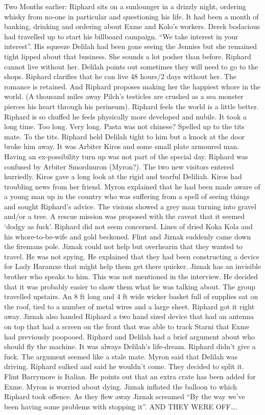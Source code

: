 Two Months earlier: Riphard sits on a sunlounger in a drizzly night, ordering whisky from no-one in particular and questioning his life. It had been a month of banking, drinking and ordering about Exme and Kolo’s workers. Derek bodacious had travelled up to start his billboard campaign. “We take interest in your interest”. His squeeze Delilah had been gone seeing the Jennies but she remained tight lipped about that business. She sounds a lot posher than before. Riphard cannot live without her. Delilah points out sometimes they will need to go to the shops. Riphard clarifies that he can live 48 hours/2 days without her. The romance is retained. And Riphard proposes making her the happiest whore in the world. (A thousand miles away Pilch’s testicles are crushed as a sea monster pierces his heart through his perineum). Riphard feels the world is a little better. Riphard is so chuffed he feels physically more developed and nubile. It took a long time. Too long. Very long. Pasta was not chinese? Spelled up to the tits mate. To the tits. Riphard held Delilah tight to him but a knock at the door broke him away. It was Arbiter Kiros and some small plate armoured man. Having an ex-possibility turn up was not part of the special day. Riphard was confused by Arbiter Smordnuron (Myron?). The two new visitors entered hurriedly. Kiros gave a long look at the rigid and tearful Deliliah. Kiros had troubling news from her friend. Myron explained that he had been made aware of a young man up in the country who was suffering from a spell of seeing things and sought Riphard’s advice. The visions showed a grey man turning into gravel and/or a tree. A rescue mission was proposed with the caveat that it seemed ‘dodgy as fuck’. Riphard did not seem concerned. Lines of dried Koka Kola and his whore-to-be-wife and gold beckoned. Flint and Jiznak suddenly came down the firemans pole. Jiznak could not help but overhearin that they wanted to travel. He was not spying. He explained that they had been constructing a device for Lady Haramxe that might help them get there quicker. Jiznak has an invisible brother who speaks to him. This was not mentioned in the interview. He decided that it was probably easier to show them what he was talking about. The group travelled upstairs. An 8 ft long and 4 ft wide wicker basket full of supplies sat on the roof, tied to a number of metal wires and a large sheet. Riphard got it right away. Jiznak also handed Riphard a two hand sized device that had an antenna on top that had a screen on the front that was able to track Starni that Exme had previously poopooed. Riphard and Delilah had a brief argument about who should fly the machine. It was always Delilah’s life-dream. Riphard didn’t give a fuck. The argument seemed like a stale mate. Myron said that Delilah was driving. Riphard sulked and said he wouldn’t come. They decided to split it. Flint Barrymore is Italian. He points out that an extra crate has been added for Exme. Myron is worried about dying. Jiznak inflated the balloon to which Riphard took offence. As they flew away Jiznak screamed “By the way we’ve been having some problems with stopping it”. AND THEY WERE OFF….\medskip

